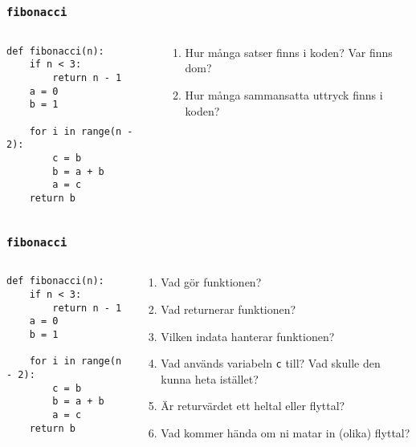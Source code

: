 \documentclass{beamer}
\begin{document}
  \begin{frame}[fragile]
    \frametitle{\texttt{fibonacci}}

    \begin{columns}
      \begin{column}{0.48\textwidth}
        \begin{verbatim}
def fibonacci(n):
    if n < 3:
        return n - 1
    a = 0
    b = 1

    for i in range(n - 2):
        c = b
        b = a + b
        a = c
    return b
        \end{verbatim}
      \end{column}%
      \begin{column}{0.48\textwidth}
        \begin{enumerate}
          \item Hur många satser finns i koden? Var finns dom?
          \item Hur många sammansatta uttryck finns i koden?
        \end{enumerate}
      \end{column}%
    \end{columns}
  \end{frame}

  \begin{frame}[fragile]
    \frametitle{\texttt{fibonacci}}

    \begin{columns}
      \begin{column}{0.48\textwidth}
        \begin{verbatim}
def fibonacci(n):
    if n < 3:
        return n - 1
    a = 0
    b = 1

    for i in range(n - 2):
        c = b
        b = a + b
        a = c
    return b
        \end{verbatim}
      \end{column}%
      \begin{column}{0.48\textwidth}
        \begin{enumerate}
          \item Vad gör funktionen?
          \item Vad returnerar funktionen?
          \item Vilken indata hanterar funktionen?
          \item Vad används variabeln \texttt{c} till? Vad skulle den kunna heta istället?
          \item Är returvärdet ett heltal eller flyttal?
          \item Vad kommer hända om ni matar in (olika) flyttal?
        \end{enumerate}
      \end{column}%
    \end{columns}
  \end{frame}
\end{document}
